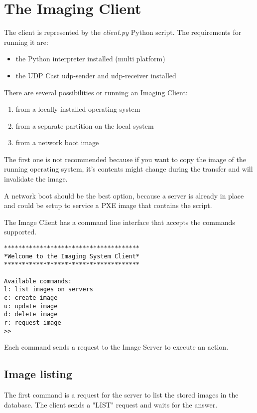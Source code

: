 

\chapter{The Imaging Client}\label{ch:client}

The client is represented by the \emph{client.py} Python script. The
requirements for running it are:
\begin{itemize}
\item the Python interpreter installed (multi platform)
\item the UDP Cast udp-sender and udp-receiver installed
\end{itemize}

There are several possibilities or running an Imaging Client:
\begin{enumerate}
\item from a locally installed operating system
\item from a separate partition on the local system
\item from a network boot image
\end{enumerate}

The first one is not recommended because if you want to copy the image of
the running operating system, it's contents might change during the
transfer and will invalidate the image.

A network boot should be the best option, because a server is already in
place and could be setup to service a \ac{PXE} image that contains the script.

The Image Client has a command line interface that accepts the commands
supported.

\begin{lstlisting}[caption= Image Client CLI]
**************************************
*Welcome to the Imaging System Client*
**************************************

Available commands:
l: list images on servers
c: create image
u: update image
d: delete image
r: request image
>>
\end{lstlisting}

Each command sends a request to the Image Server to execute an action.


\section{Image listing}

The first command is a request for the server to list the stored images in
the database. The client sends a "LIST" request and waits for the answer.


